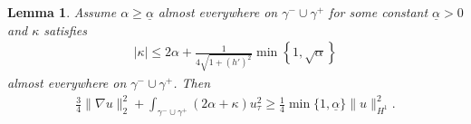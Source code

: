 \documentclass{article}
\newtheorem{lemma}[theorem]{Lemma}
\theoremstyle{definition}
\theoremstyle{definition}
\begin{document}
\begin{lemma}
\label{lemma-H1-bounded-by-grad-and-bdry-terms}
Assume $\alpha \geq \underline{\alpha}$ almost everywhere on $\gamma^-\cup\gamma^+$ for some constant $\underline{\alpha}>0$ and $\kappa$ satisfies
\begin{align}
    \label{energy_condition_explicite_kappa}
    |\kappa| \leq 2\alpha + \frac{1}{4\sqrt{1+(h')^2}} \min\left\lbrace 1, \sqrt{\alpha} \right\rbrace
\end{align}
almost everywhere on $\gamma^-\cup\gamma^+$. Then
\begin{align}
    \label{H1-bounded-by-grad-and-bdry-terms}
    \frac{3}{4}\|\nabla u\|_2^2 + \int_{\gamma^-\cup\gamma^+} (2\alpha+\kappa) u_\tau^2 \geq \frac{1}{4}\min\lbrace 1, \underline{\alpha}\rbrace \|u\|_{H^1}^2.
\end{align}
\end{lemma}
\end{document}
